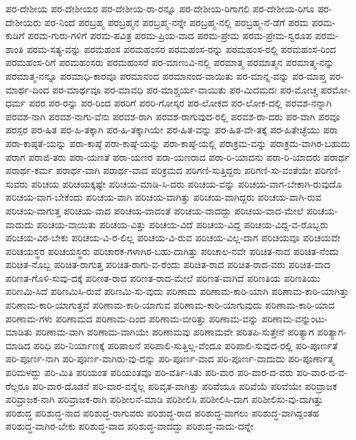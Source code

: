 {ಪರ-ದೇಶೀಯ
ಪರ-ದೇಶೀಯರ
ಪರ-ದೇಶೀಯ-ರಾ-ರನ್ನೂ
ಪರ-ದೇಶೀಯ-ರಿಗಾಗಲಿ
ಪರ-ದೇಶೀಯ-ರಿಗೂ
ಪರ-ದೇಶೀಯರು
ಪರ-ನಿಂದೆ
ಪರಬ್ರಹ್ಮ
ಪರಬ್ರಹ್ಮನ
ಪರಬ್ರಹ್ಮ-ನನ್ನೇ
ಪರಬ್ರಹ್ಮ-ನಲ್ಲಿ
ಪರಬ್ರಹ್ಮ-ನೆ-ಡೆಗೆ
ಪರಮ
ಪರಮ-ಕುಡಿಗೆ
ಪರಮ-ಗುರು-ಗಳಿಗೆ
ಪರಮ-ಪವಿತ್ರ
ಪರಮ-ಪ್ರಿಯ-ವಾದ
ಪರಮ-ಪ್ರೇಮ
ಪರಮ-ಪ್ರೇಮ-ಸ್ವರೂಪ
ಪರಮ-ಶಾಂತಿ
ಪರಮ-ಸತ್ಯ-ವನ್ನು
ಪರಮಹಂಸ
ಪರಮಹಂಸರ
ಪರಮಹಂಸ-ರನ್ನು
ಪರಮಹಂಸ-ರಲ್ಲಿ
ಪರಮಹಂಸ-ರಿಂದ
ಪರಮಹಂಸ-ರಿಗೆ
ಪರಮಹಂಸರು
ಪರಮಹಂಸರೆ
ಪರ-ಮಾಣುವಿ-ನಲ್ಲಿ
ಪರಮಾತ್ಮ
ಪರಮಾತ್ಮನ
ಪರಮಾತ್ಮ-ನನ್ನು
ಪರಮಾತ್ಮ-ನನ್ನೂ
ಪರಮಾಧಿ-ಕಾರವೂ
ಪರಮಾನಂದ
ಪರಮಾನಂದ-ವಾಯಿತು
ಪರ-ಮಾನ್ನ-ವನ್ನು
ಪರ-ಮಾಪ್ತ
ಪರ-ಮಾರ್ಥ-ದಿಂದ
ಪರ-ಮಾರ್ಥವೂ
ಪರ-ಮಾವಧಿ
ಪರ-ಮಾಶ್ಚರ್ಯ-ವಾಯಿತು
ಪರ-ಮಿದಮದಃ
ಪರ-ಮೋಚ್ಚ
ಪರಮೋ-ಧರ್ಮ
ಪರರ
ಪರ-ರನ್ನು
ಪರ-ರಿಂದ
ಪರರಿಗೆ
ಪರರಿ-ಗೋಸ್ಕರ
ಪರ-ಲೋಕದ
ಪರ-ಲೋಕ-ದಲ್ಲಿ
ಪರವಶ-ನನ್ನಾಗಿ
ಪರವಶ-ನಾಗಿ
ಪರವಶ-ನಾಗು-ವೆನು
ಪರವಶ-ರಾಗಿ
ಪರವಶ-ರಾಗುವುದ-ರಲ್ಲಿ
ಪರವಶ-ರಾ-ದರು
ಪರ-ವಾಗಿ
ಪರವೂ
ಪರಸ್ಪರ
ಪರ-ಹಿತ
ಪರ-ಹಿ-ತಕ್ಕಾಗಿ
ಪರ-ಹಿ-ತಕ್ಕಾಗಿಯೇ
ಪರ-ಹಿತ-ವನ್ನು
ಪರ-ಹಿತ-ವೇ-ತಕ್ಕೆ
ಪರ-ಹಿತೇಚ್ಛೆಯು
ಪರಾ
ಪರಾ-ಕಾಷ್ಠತೆ-ಯನ್ನು
ಪರಾ-ಕಾಷ್ಠೆ
ಪರಾ-ಕಾಷ್ಠೆ-ಯನ್ನು
ಪರಾ-ಕಾಷ್ಠೆ-ಯಲ್ಲಿ
ಪರಾಕ್ರಮ-ವನ್ನು
ಪರಾಕ್ರಮ-ವಾಗಿರ-ಬಹುದು
ಪರಾಗ
ಪರಾಜಿ-ತರು
ಪರಾ-ಯಣತೆ
ಪರಾ-ಯಣರ
ಪರಾ-ಯಣರಾದ
ಪರಾ-ರಿ-ಯಾದನು
ಪರಾ-ರಿ-ಯಾದರು
ಪರಾರ್ಥ
ಪರಾರ್ಥ-ಕರ್ಮ
ಪರಾರ್ಥ-ವಾಗಿ
ಪರಾರ್ಥ-ವಾದ
ಪರಿಕ್ರಮದ
ಪರಿಗಣಿ-ಸುತ್ತಿದ್ದರು
ಪರಿಗಣಿ-ಸು-ವಂತೆಯೇ
ಪರಿಗಣಿ-ಸುವರು
ಪರಿಚಯ
ಪರಿಚಯಕ್ಕಷ್ಟೇ
ಪರಿಚಯ-ಮಾಡಿ-ಸಿ-ದರು
ಪರಿಚಯ-ವನ್ನು
ಪರಿಚಯ-ವಾಗ-ಬೇಕಾಗಿ-ರುವುದೊ
ಪರಿಚಯ-ವಾಗ-ಬೇಕೆಂದು
ಪರಿಚಯ-ವಾಗಿ
ಪರಿಚಯ-ವಾಗಿತ್ತು
ಪರಿಚಯ-ವಾಗಿದ್ದರು
ಪರಿಚಯ-ವಾಗಿ-ರುವ
ಪರಿಚಯ-ವಾಗುತ್ತ
ಪರಿಚಯ-ವಾದ
ಪರಿಚಯ-ವಾದಂತೆ
ಪರಿಚಯ-ವಾದದ್ದು
ಪರಿಚಯ-ವಾದ-ಮೇಲೆ
ಪರಿಚಯ-ವಾದುದು
ಪರಿಚಯ-ವಾಯಿತು
ಪರಿಚಯ-ವಿತ್ತು
ಪರಿಚಯ-ವಿದೆ
ಪರಿಚಯ-ವಿದ್ದ
ಪರಿಚಯ-ವಿದ್ದ-ವ-ರೊಬ್ಬರು
ಪರಿಚಯ-ವಿರ-ಬೇಕು
ಪರಿಚಯ-ವಿ-ರ-ಲಿಲ್ಲ
ಪರಿಚಯ-ವಿ-ರುವ
ಪರಿಚಯ-ವಿಲ್ಲ-ದಾಗ
ಪರಿಚಯವೂ
ಪರಿಚಯವೇ
ಪರಿಚಯಸ್ಥರ
ಪರಿಚಯಸ್ಥರು
ಪರಿಚಾರಕ-ಗಳಾಗಿರ-ಬಹು-ದಾಗಿತ್ತು
ಪರಿಚಾಲ-ನವೇ
ಪರಿಚಿತ-ನಾದ
ಪರಿಚಿತ-ನೆಂದು
ಪರಿಚಿತ-ನೊಬ್ಬ
ಪರಿಚಿತ-ರಾಗುತ್ತ
ಪರಿಚಿತ-ರಾಗು-ವ-ರೆಂದು
ಪರಿಚಿತ-ರಾದ
ಪರಿಚಿತ-ರಾದ-ವರು
ಪರಿಚಿತ-ವಾದ
ಪರಿಣತ-ಗೊಳಿ-ಸುವು-ದಕ್ಕೆ
ಪರಿಣತ-ರಾದ
ಪರಿಣತ-ರಾದ-ಮೇಲೆ
ಪರಿಣತ-ವಾಗಿದೆ
ಪರಿಣತಿಯ
ಪರಿಣತಿಯು
ಪರಿಣಮಿ-ಸಿದೆ
ಪರಿಣಮಿಸಿ-ರುವೆ
ಪರಿಣಮಿ-ಸು-ವುದು
ಪರಿಣಾಮ
ಪರಿಣಾಮ-ಕಾರಿ-ಯಾಗಿ
ಪರಿಣಾಮ-ಕಾರಿ-ಯಾಗಿತ್ತು
ಪರಿಣಾಮ-ಕಾರಿ-ಯಾಗುತ್ತವೆ
ಪರಿಣಾಮ-ಕಾರಿ-ಯಾಗುವ
ಪರಿಣಾಮ-ಕಾರಿ-ಯಾಗುವುದು
ಪರಿಣಾಮ-ಕಾರಿ-ಯಾದ
ಪರಿಣಾಮ-ಗಳು
ಪರಿಣಾಮದ
ಪರಿಣಾಮ-ದಿಂದ
ಪರಿಣಾಮ-ಬೀರಿತ್ತು
ಪರಿಣಾಮ-ವನ್ನು
ಪರಿಣಾಮ-ವನ್ನುಂಟು-ಮಾಡಿತು
ಪರಿಣಾಮ-ವಾಗಿ
ಪರಿಣಾಮ-ವಾಗಿಯೇ
ಪರಿಣಾಮವು
ಪರಿಣಾಮವೇ
ಪರಿತಪಿ-ಸುತ್ತೇನೆ
ಪರಿತ್ಯಾಗ
ಪರಿತ್ಯಾಗ-ಮಾಡಿದ
ಪರಿಧಿ
ಪರಿ-ನಿರ್ಯಾಣಕ್ಕೆ
ಪರಿಪಾಲನೆ
ಪರಿಪಾಲಿ-ಸುತ್ತಿಲ್ಲ-ವೆಂದೂ
ಪರಿಪಾಲಿ-ಸುವುದ-ರಲ್ಲಿ
ಪರಿ-ಪೂರ್ಣತೆ
ಪರಿ-ಪೂರ್ಣ-ನಾಗಿ
ಪರಿ-ಪೂರ್ಣ-ವಾಗಿರು-ವು-ದನ್ನು
ಪರಿ-ಪೂರ್ಣ-ವಾದ
ಪರಿ-ಪೂರ್ಣ-ವಾದುದು
ಪರಿ-ಪೂರ್ಣಾತ್ಮ
ಪರಿಮಳದ್ದು
ಪರಿ-ಮಿತಿ
ಪರಿಯಂತ
ಪರಿಯಂತವೂ
ಪರಿ-ವರ್ತಿ-ಸಿತು
ಪರಿ-ವಾರ
ಪರಿ-ವಾರ-ದ-ವರು
ಪರಿ-ವಾರ-ದ-ವ-ರೆಲ್ಲರೂ
ಪರಿ-ವಾರ-ದೊಡನೆ
ಪರಿ-ವಾರ-ವನ್ನೆಲ್ಲ
ಪರಿವೃತ-ವಾಗಿತ್ತು
ಪರಿವೆಯೂ
ಪರಿವೆಯೆ
ಪರಿವೆಯೇ
ಪರಿವ್ರಾಜಕ
ಪರಿವ್ರಾಜಕ-ನಾಗಿ
ಪರಿವ್ರಾಜಕ-ರಾಗಿ
ಪರಿಶೀಲನೆ-ಮಾಡಿ
ಪರಿಶೀಲಿಸಿ
ಪರಿಶೀಲಿಸಿ-ದಾಗ
ಪರಿಶೀಲಿಸು-ವು-ದಾಗಿತ್ತು
ಪರಿಶುದ್ಧ
ಪರಿಶುದ್ಧ-ನಾದ
ಪರಿಶುದ್ಧ-ರಾಗುವರು
ಪರಿಶುದ್ಧ-ರಾದ
ಪರಿಶುದ್ಧ-ವಾಗಲು
ಪರಿಶುದ್ಧ-ವಾಗಿದ್ದಂತಹ
ಪರಿಶುದ್ಧ-ವಾಗಿರ-ಬೇಕು
ಪರಿಶುದ್ಧ-ವಾದ
ಪರಿಶುದ್ಧ-ವಾದದ್ದು
ಪರಿಶುದ್ಧ-ವಾದು-ದನ್ನೇ
}

